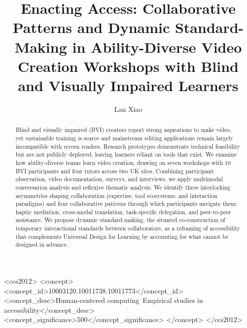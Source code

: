 \documentclass[manuscript,screen,review,anonymous]{acmart}
\begin{document}
\title{Enacting Access: Collaborative Patterns and Dynamic Standard-Making in Ability-Diverse Video Creation Workshops with Blind and Visually Impaired Learners}

\author{Lan Xiao}

\renewcommand{\shortauthors}{Xiao et al.}

\begin{abstract}
Blind and visually impaired (BVI) creators report strong aspirations to make video, yet sustainable training is scarce and mainstream editing applications remain largely incompatible with screen readers. Research prototypes demonstrate technical feasibility but are not publicly deployed, leaving learners reliant on tools that exist. We examine how ability-diverse teams learn video creation, drawing on seven workshops with 10 BVI participants and four tutors across two UK sites. Combining participant observation, video documentation, surveys, and interviews, we apply multimodal conversation analysis and reflexive thematic analysis. We identify three interlocking asymmetries shaping collaboration (expertise, tool ecosystems, and interaction paradigms) and four collaborative patterns through which participants navigate them: haptic mediation, cross-modal translation, task-specific delegation, and peer-to-peer assistance. We propose dynamic standard-making, the situated co-construction of temporary interactional standards between collaborators, as a reframing of accessibility that complements Universal Design for Learning by accounting for what cannot be designed in advance.
\end{abstract}

\begin{CCSXML}
<ccs2012>
   <concept>
       <concept_id>10003120.10011738.10011773</concept_id>
       <concept_desc>Human-centered computing~Empirical studies in accessibility</concept_desc>
       <concept_significance>500</concept_significance>
       </concept>
 </ccs2012>
\end{CCSXML}
\end{document}
